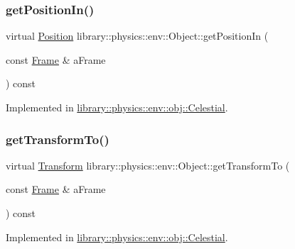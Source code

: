 \subsubsection{\texorpdfstring{get\+Position\+In()}{getPositionIn()}}
{\footnotesize\ttfamily virtual \hyperlink{classlibrary_1_1physics_1_1coord_1_1_position}{Position} library\+::physics\+::env\+::\+Object\+::get\+Position\+In (\begin{DoxyParamCaption}\item[{const \hyperlink{classlibrary_1_1physics_1_1coord_1_1_frame}{Frame} \&}]{a\+Frame }\end{DoxyParamCaption}) const\hspace{0.3cm}{\ttfamily [pure virtual]}}



Implemented in \hyperlink{classlibrary_1_1physics_1_1env_1_1obj_1_1_celestial_a3b5b5b5e1f0749345afc5e6cead6e86e}{library\+::physics\+::env\+::obj\+::\+Celestial}.

\mbox{\label{classlibrary_1_1physics_1_1env_1_1_object_a21312b7217aeb12086681401b4a6c41f}} 
\subsubsection{\texorpdfstring{get\+Transform\+To()}{getTransformTo()}}
{\footnotesize\ttfamily virtual \hyperlink{classlibrary_1_1physics_1_1coord_1_1_transform}{Transform} library\+::physics\+::env\+::\+Object\+::get\+Transform\+To (\begin{DoxyParamCaption}\item[{const \hyperlink{classlibrary_1_1physics_1_1coord_1_1_frame}{Frame} \&}]{a\+Frame }\end{DoxyParamCaption}) const\hspace{0.3cm}{\ttfamily [pure virtual]}}



Implemented in \hyperlink{classlibrary_1_1physics_1_1env_1_1obj_1_1_celestial_aa8efdcb1d3e0f51be20291a74ca1fdc7}{library\+::physics\+::env\+::obj\+::\+Celestial}.

\mbox{\label{classlibrary_1_1physics_1_1env_1_1_object_a7035edc921681401ddd43b094645a024}} 
